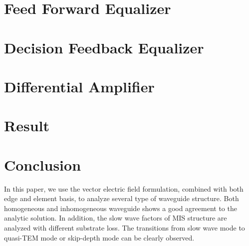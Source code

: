 \documentclass{pj}
\begin{document}
\section{Feed Forward Equalizer}
\label{sec:FFE}

\section{Decision Feedback Equalizer}
\label{sec:DFE}

\section{Differential Amplifier}
\label{sec:diff_Op}

\section{Result}
\label{sec:result}







\section{Conclusion}
In this paper, we use the vector electric field formulation, combined with both edge and element basis, to analyze several type of waveguide structure. Both homogeneous and inhomogeneous  waveguide shows a good agreement to the analytic solution. In addition, the slow wave factors of MIS structure are analyzed with different substrate loss. The transitions from slow wave mode to quasi-TEM mode or skip-depth mode can be clearly observed. 


%
%

%
\end{document}
